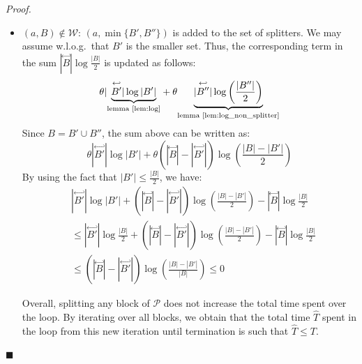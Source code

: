 \documentclass[12pt, a4 paper]{article}
\renewenvironment{proof}[1][Proof]{\begin{mdframed}[backgroundcolor=black!5, topline=false, rightline=false, bottomline=false, linecolor=black!15, linewidth=3pt]{\noindent\textit{#1.}\ }}{\noindent\par\hfill$\blacksquare$\end{mdframed}}
\theoremstyle{definition}
\begin{document}
\begin{proof}
\begin{itemize}
        \item $(a, B) \notin \mathcal{W}$: $(a, \min\{B', B''\})$ is added to the set of splitters. We may assume w.l.o.g.\ that $B'$ is the smaller set.
        Thus, the corresponding term in the sum $|\overset{\hookleftarrow}{B}| \log \frac{| B |}{2}$ is updated as follows:
        \begin{equation*}
            \theta | \underset{\text{lemma \ref{lem:log}}}{\underbrace{\overset{\hookleftarrow}{B'} | \log | B' |}} + \theta \underset{\text{lemma \ref{lem:log_non_splitter}}}{\underbrace{|\overset{\hookleftarrow}{B''} | \log \left(\frac{| B'' |}{2}\right)}}
        \end{equation*}
        Since $B = B' \cup B''$, the sum above can be written as:
        \begin{equation*}
            \theta | \overset{\hookleftarrow}{B'} | \log | B' | + \theta (| \overset{\hookleftarrow}{B} | - | \overset{\hookleftarrow}{B'} |) \log \left(\frac{|B|-|B'|}{2}\right)
        \end{equation*}
        By using the fact that $\displaystyle{| B' | \leq \frac{|B|}{2}}$, we have:
        \begin{align*}
            & | \overset{\hookleftarrow}{B'} | \log | B'| + (| \overset{\hookleftarrow}{B} | - | \overset{\hookleftarrow}{B'}|)\log \left(\frac{| B | - |B'|}{2} \right) - |\overset{\hookleftarrow}{B}| \log \frac{|B|}{2} \\
            & \leq | \overset{\hookleftarrow}{B'}| \log \frac{| B |}{2} + (| \overset{\hookleftarrow}{B}| - | \overset{\hookleftarrow}{B'}|) \log \left(\frac{|B| - |B'|}{2}\right) - | \overset{\hookleftarrow}{B}| \log \frac{| B |}{2} \\
            & \leq (| \overset{\hookleftarrow}{B}| - | \overset{\hookleftarrow}{B'} |) \log \left(\frac{| B | - | B' |}{| B |}\right) \leq 0
        \end{align*}

        Overall, splitting any block of $\mathcal{P}$ does not increase the total time spent over the loop.
        By iterating over all blocks, we obtain that the total time $\hat{T}$ spent in the loop from this new iteration until termination is such that $\hat{T} \leq T$.
    \end{itemize}
\end{proof}

\bigskip
\end{document}
